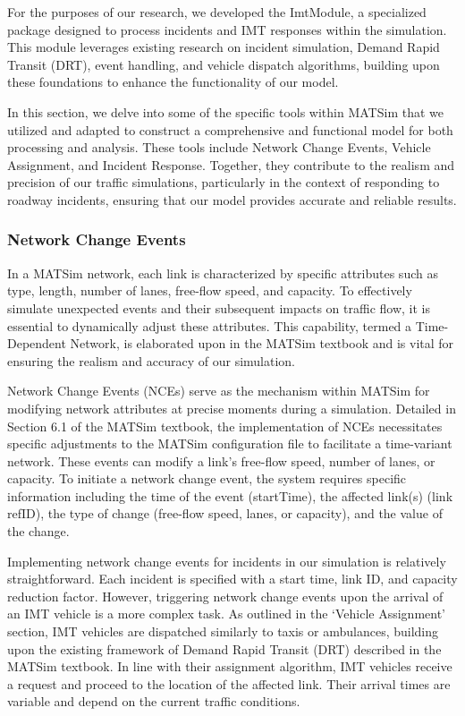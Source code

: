 \documentclass[
  letterpaper,
  authoryear]{elsarticle}
\begin{document}
For the purposes of our research, we developed the ImtModule, a
specialized package designed to process incidents and IMT responses
within the simulation. This module leverages existing research on
incident simulation, Demand Rapid Transit (DRT), event handling, and
vehicle dispatch algorithms, building upon these foundations to enhance
the functionality of our model.

In this section, we delve into some of the specific tools within MATSim
that we utilized and adapted to construct a comprehensive and functional
model for both processing and analysis. These tools include Network
Change Events, Vehicle Assignment, and Incident Response. Together, they
contribute to the realism and precision of our traffic simulations,
particularly in the context of responding to roadway incidents, ensuring
that our model provides accurate and reliable results.

\hypertarget{network-change-events}{%
\subsubsection{Network Change Events}\label{network-change-events}}

In a MATSim network, each link is characterized by specific attributes
such as type, length, number of lanes, free-flow speed, and capacity. To
effectively simulate unexpected events and their subsequent impacts on
traffic flow, it is essential to dynamically adjust these attributes.
This capability, termed a Time-Dependent Network, is elaborated upon in
the MATSim textbook and is vital for ensuring the realism and accuracy
of our simulation.

Network Change Events (NCEs) serve as the mechanism within MATSim for
modifying network attributes at precise moments during a simulation.
Detailed in Section 6.1 of the MATSim textbook, the implementation of
NCEs necessitates specific adjustments to the MATSim configuration file
to facilitate a time-variant network. These events can modify a link's
free-flow speed, number of lanes, or capacity. To initiate a network
change event, the system requires specific information including the
time of the event (startTime), the affected link(s) (link refID), the
type of change (free-flow speed, lanes, or capacity), and the value of
the change.

Implementing network change events for incidents in our simulation is
relatively straightforward. Each incident is specified with a start
time, link ID, and capacity reduction factor. However, triggering
network change events upon the arrival of an IMT vehicle is a more
complex task. As outlined in the `Vehicle Assignment' section, IMT
vehicles are dispatched similarly to taxis or ambulances, building upon
the existing framework of Demand Rapid Transit (DRT) described in the
MATSim textbook. In line with their assignment algorithm, IMT vehicles
receive a request and proceed to the location of the affected link.
Their arrival times are variable and depend on the current traffic
conditions.
\end{document}
